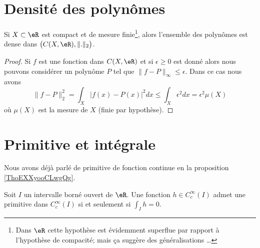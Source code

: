
\section{Densité des polynômes}

\begin{corollary}   \label{CorRSczQD}
	Si \( X\subset \eR\) est compact et de mesure finie\footnote{Dans \( \eR\) cette hypothèse est évidemment superflue par rapport à l'hypothèse de compacité; mais ça suggère des généralisations \ldots}, alors l'ensemble des polynômes est dense dans \( \big( C(X,\eR),\| . \|_2 \big)\).
\end{corollary}

\begin{proof}
	Si \( f\) est une fonction dans \( C(X,\eR)\) et si \( \epsilon\geq 0\) est donné alors nous pouvons considérer un polynôme \( P\) tel que \( \| f-P \|_{\infty}\leq \epsilon\). Dans ce cas nous avons
	\begin{equation}
		\| f-P \|_2^2=\int_X| f(x)-P(x) |^2dx\leq \int_X\epsilon^2dx=\epsilon^2\mu(X)
	\end{equation}
	où \( \mu(X)\) est la mesure de \( X\) (finie par hypothèse).
\end{proof}

\section{Primitive et intégrale}

Nous avons déjà parlé de primitive de fonction continue en la proposition \ref{ThoEXXyooCLwgQg}.

\begin{proposition} \label{PropHFWNpRb}
	Soit \( I \) un intervalle borné ouvert de \( \eR\). Une fonction \( h\in C^{\infty}_c(I)\) admet une primitive dans \(  C^{\infty}_c(I)\) si et seulement si \( \int_Ih=0\).
\end{proposition}

